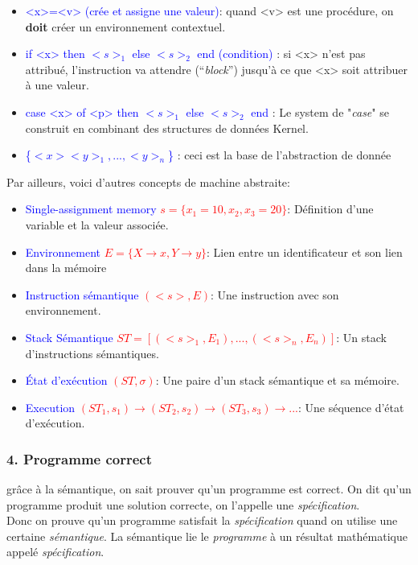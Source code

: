 \documentclass{report}
\begin{document}
\begin{itemize}
\item \textcolor{blue}{<x>=<v> (crée et assigne une valeur)}: quand <v> est une procédure, on \textbf{doit} créer un environnement contextuel.
\item \textcolor{blue}{if <x> then $<s>_1$ else $<s>_2$ end (condition)} : si <x> n'est pas attribué, l'instruction va attendre (“\textit{block}”) jusqu'à ce que <x> soit attribuer à une valeur.
\item \textcolor{blue}{case <x> of <p> then $<s>_1$ else $<s>_2$ end} : Le system de "\textit{case}" se construit en combinant des structures de données Kernel.
\item \textcolor{blue}{\{$<x> <y>_1, ..., <y>_n$\}} : ceci est la base de l'abstraction de donnée
\end{itemize}
Par ailleurs, voici d'autres concepts de machine abstraite:
\begin{itemize}
\item \textcolor{blue}{Single-assignment memory }\textcolor{red}{$s = \{x_1=10, x_2, x_3=20\}$}: Définition d'une variable et la valeur associée.
\item \textcolor{blue}{Environnement }\textcolor{red}{$E = \{X \rightarrow x, Y \rightarrow y\}$}: Lien entre un identificateur et son lien dans la mémoire
\item \textcolor{blue}{Instruction sémantique }\textcolor{red}{$(<s>, E)$}: Une instruction avec son environnement.
\item \textcolor{blue}{Stack Sémantique }\textcolor{red}{$ST = [(<s>_1,E_1), ..., (<s>_n,E_n)]$}: Un stack d'instructions sémantiques.
\item \textcolor{blue}{État d'exécution }\textcolor{red}{$(ST,\sigma)$}: Une paire d'un stack sémantique et sa mémoire.
\item \textcolor{blue}{Execution }\textcolor{red}{$(ST_1,s_1) \rightarrow (ST_2,s_2) \rightarrow (ST_3,s_3) \rightarrow ...$}: Une séquence d'état d'exécution. 
\end{itemize}

\subsubsection{4. Programme correct}
grâce à la sémantique, on sait prouver qu'un programme est correct. On dit qu'un programme produit une solution correcte, on l'appelle une \textit{spécification}.\\
Donc on prouve qu'un programme satisfait la \textit{spécification} quand on utilise une certaine \textit{sémantique}. La sémantique lie le \textit{programme} à un résultat mathématique appelé \textit{spécification}.\\
\end{document}
